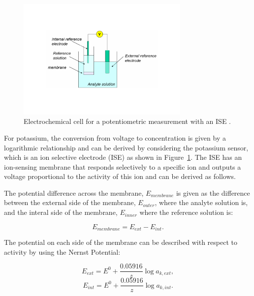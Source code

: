 \begin{figure}[h!]
\centering
\includegraphics[trim={0cm 5cm 0cm  5cm}, clip, width=0.75\textwidth]{./figures/ISE.pdf}
\captionsetup{justification=centering}
\caption{Electrochemical cell for a potentiometric measurement with an ISE \cite{LibreTexts2019}.}
\label{fig: ISE}
\end{figure}

For potassium, the conversion from voltage to concentration is given by a logarithmic relationship and can be derived by considering the potassium sensor, which is an ion selective electrode (ISE) as shown in Figure~\ref{fig: ISE}. The ISE has an ion-sensing membrane that responds selectively to a specific ion and outputs a voltage proportional to the activity of this ion \cite{Rogers2017, LibreTexts2019} and can be derived as follows. 

The potential difference across the membrane, $E_{membrane}$ is given as the difference between the external side of the membrane, $E_{outer}$, where the analyte solution is, and the interal side of the membrane, $E_{inner}$ where the reference solution is:

\begin{equation}
    E_{membrane} = E_{ext} - E_{int}.
    \label{equation: membrane potential}
\end{equation}

The potential on each side of the membrane can be described with respect to activity by using the Nernst Potential:

\begin{equation}
    E_{ext} = E^{0} + \frac{0.05916}{z}\log a_{k,ext}, 
    \label{equation: outer Nernst} 
\end{equation}
\begin{equation}
    E_{int} = E^{0} + \frac{0.05916}{z}\log a_{k,int}.
    \label{equation: inner Nernst}
\end{equation}

